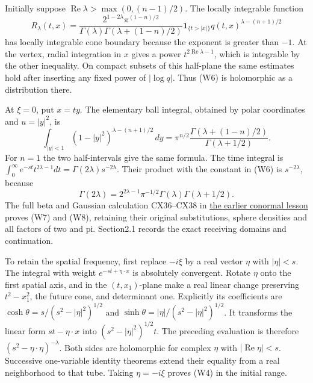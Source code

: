 \documentclass[
  11pt,
]{article}
\begin{document}
Initially suppose \(\operatorname{Re}\lambda>\max(0,(n-1)/2)\). The
locally integrable function \[
 R_\lambda(t,x)=
 \frac{2^{1-2\lambda}\pi^{(1-n)/2}}
 {\Gamma(\lambda)\Gamma(\lambda+(1-n)/2)}
 \boldsymbol1_{\{t>|x|\}}q(t,x)^{\lambda-(n+1)/2}
 \tag{W6}
\] has locally integrable cone boundary because the exponent is greater
than \(-1\). At the vertex, radial integration in \(x\) gives a power
\(t^{2\operatorname{Re}\lambda-1}\), which is integrable by the other
inequality. On compact subsets of this half-plane the same estimates
hold after inserting any fixed power of \(|\log q|\). Thus (W6) is
holomorphic as a distribution there.

At \(\xi=0\), put \(x=ty\). The elementary ball integral, obtained by
polar coordinates and \(u=|y|^2\), is \[
 \int_{|y|<1}(1-|y|^2)^{\lambda-(n+1)/2}\,dy
 =\pi^{n/2}\frac{\Gamma(\lambda+(1-n)/2)}{\Gamma(\lambda+1/2)}.
 \tag{W7}
\] For \(n=1\) the two half-intervals give the same formula. The time
integral is
\(\int_0^\infty e^{-st}t^{2\lambda-1}dt=\Gamma(2\lambda)s^{-2\lambda}\).
Their product with the constant in (W6) is \(s^{-2\lambda}\), because \[
 \Gamma(2\lambda)=2^{2\lambda-1}\pi^{-1/2}
                  \Gamma(\lambda)\Gamma(\lambda+1/2).
 \tag{W8}
\] The full beta and Gaussian calculation CX36--CX38 in
\href{conormal-transmission.pdf}{the earlier conormal lesson} proves (W7)
and (W8), retaining their original substitutions, sphere densities and
all factors of two and pi. Section2.1 records the exact receiving
domains and continuation.

To retain the spatial frequency, first replace \(-i\xi\) by a real
vector \(\eta\) with \(|\eta|<s\). The integral with weight
\(e^{-st+\eta\cdot x}\) is absolutely convergent. Rotate \(\eta\) onto
the first spatial axis, and in the \((t,x_1)\)-plane make a real linear
change preserving \(t^2-x_1^2\), the future cone, and determinant one.
Explicitly its coefficients are \(\cosh\theta=s/(s^2-|\eta|^2)^{1/2}\)
and \(\sinh\theta=|\eta|/(s^2-|\eta|^2)^{1/2}\). It transforms the
linear form \(st-\eta\cdot x\) into \((s^2-|\eta|^2)^{1/2}t\). The
preceding evaluation is therefore \((s^2-\eta\cdot\eta)^{-\lambda}\).
Both sides are holomorphic for complex \(\eta\) with
\(|\operatorname{Re}\eta|<s\). Successive one-variable identity theorems
extend their equality from a real neighborhood to that tube. Taking
\(\eta=-i\xi\) proves (W4) in the initial range.
\end{document}
